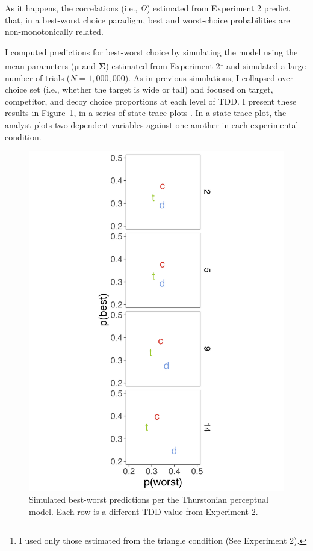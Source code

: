 As it happens, the correlations (i.e., $\Omega$) estimated from Experiment 2 predict that, in a best-worst choice paradigm, best and worst-choice probabilities are non-monotonically related. 

I computed predictions for best-worst choice by simulating the model using the mean parameters ($\boldsymbol{\mu}$ and $\boldsymbol{\Sigma}$) estimated from Experiment 2\footnote{I used only those estimated from the triangle condition (See Experiment 2).} and simulated a large number of trials ($N=1,000,000$). As in previous simulations, I collapsed over choice set (i.e., whether the target is wide or tall) and focused on target, competitor, and decoy choice proportions at each level of TDD. I present these results in Figure~\ref{fig:bw_sim}, in a series of state-trace plots \parencite{bamber1979state,ashby2022state}. In a state-trace plot, the analyst plots two dependent variables against one another in each experimental condition. 

\begin{figure}
   \includegraphics[width=\linewidth]{figures/bw_preds_sigma_constant_comp_effect_no_outliers.jpeg}
   \caption{Simulated best-worst predictions per the Thurstonian perceptual model. Each row is a different TDD value from Experiment 2.}
   \label{fig:bw_sim}
\end{figure}


